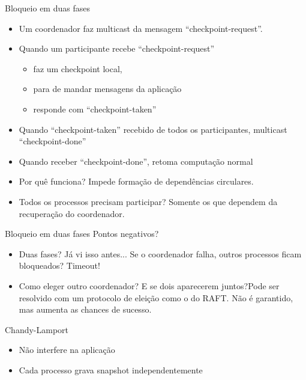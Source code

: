 \begin{frame}{Bloqueio em duas fases}
\begin{itemize}
	\item Um coordenador faz multicast da mensagem ``checkpoint-request''.
	\item Quando um participante recebe ``checkpoint-request''
	\begin{itemize}
		\item faz um checkpoint local,
		\item para de mandar mensagens da aplicação
		\item responde com ``checkpoint-taken''
	\end{itemize}
	\item Quando ``checkpoint-taken'' recebido de todos os participantes, multicast ``checkpoint-done''
	\item Quando receber ``checkpoint-done'', retoma computação normal
\end{itemize}

\begin{itemize}
	\item Por quê funciona? \pause Impede formação de dependências circulares.
	\item Todos os processos precisam participar? \pause Somente os que dependem da recuperação do coordenador.
\end{itemize}
\end{frame}

\begin{frame}{Bloqueio em duas fases}
Pontos negativos? \pause
\begin{itemize}
	\item Duas fases? Já vi isso antes... \pause Se o coordenador falha, outros processos ficam bloqueados? \pause Timeout!
	\item Como eleger outro coordenador? E se dois aparecerem juntos?\pause Pode ser resolvido com um protocolo de eleição como o do RAFT. \pause{} Não é garantido, mas aumenta as chances de sucesso.
\end{itemize}
\end{frame}

\begin{frame}{Chandy-Lamport}
	
	\begin{itemize}
		\item Não interfere na aplicação
		\item Cada processo grava snapshot independentemente
	\end{itemize}
\end{frame}


